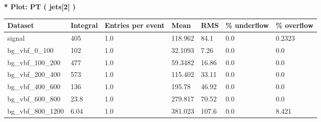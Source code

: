 \documentclass[a4paper, 10pt]{article}
\begin{document}
\textbf{* Plot: PT ( jets[2] ) }\\
   \begin{table}[H]
  \begin{center}
    \begin{tabular}{|m{23.0mm}|m{23.0mm}|m{18.0mm}|m{19.0mm}|m{19.0mm}|m{19.0mm}|m{19.0mm}|}
      \hline
      {\cellcolor{yellow}         Dataset}& {\cellcolor{yellow}         Integral}& {\cellcolor{yellow}         Entries per event}& {\cellcolor{yellow}         Mean}& {\cellcolor{yellow}         RMS}& {\cellcolor{yellow}         \% underflow}& {\cellcolor{yellow}         \% overflow}\\
      \hline
      {\cellcolor{white}         signal}& {\cellcolor{white}         405}& {\cellcolor{white}         1.0}& {\cellcolor{white}         118.962}& {\cellcolor{white}         84.1}& {\cellcolor{green}         0.0}& {\cellcolor{green}         0.2323}\\
      \hline
      {\cellcolor{white}         bg\_vbf\_0\_100}& {\cellcolor{white}         102}& {\cellcolor{white}         1.0}& {\cellcolor{white}         32.1093}& {\cellcolor{white}         7.26}& {\cellcolor{green}         0.0}& {\cellcolor{green}         0.0}\\
      \hline
      {\cellcolor{white}         bg\_vbf\_100\_200}& {\cellcolor{white}         477}& {\cellcolor{white}         1.0}& {\cellcolor{white}         59.3482}& {\cellcolor{white}         16.86}& {\cellcolor{green}         0.0}& {\cellcolor{green}         0.0}\\
      \hline
      {\cellcolor{white}         bg\_vbf\_200\_400}& {\cellcolor{white}         573}& {\cellcolor{white}         1.0}& {\cellcolor{white}         115.402}& {\cellcolor{white}         33.11}& {\cellcolor{green}         0.0}& {\cellcolor{green}         0.0}\\
      \hline
      {\cellcolor{white}         bg\_vbf\_400\_600}& {\cellcolor{white}         136}& {\cellcolor{white}         1.0}& {\cellcolor{white}         195.78}& {\cellcolor{white}         46.92}& {\cellcolor{green}         0.0}& {\cellcolor{green}         0.0}\\
      \hline
      {\cellcolor{white}         bg\_vbf\_600\_800}& {\cellcolor{white}         23.8}& {\cellcolor{white}         1.0}& {\cellcolor{white}         279.817}& {\cellcolor{white}         70.52}& {\cellcolor{green}         0.0}& {\cellcolor{green}         0.0}\\
      \hline
      {\cellcolor{white}         bg\_vbf\_800\_1200}& {\cellcolor{white}         6.04}& {\cellcolor{white}         1.0}& {\cellcolor{white}         381.023}& {\cellcolor{white}         107.6}& {\cellcolor{orange}         0.0}& {\cellcolor{orange}         8.421}\\

\end{tabular}
\end{center}
\end{table}
\end{document}
